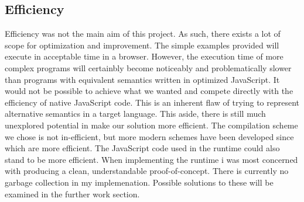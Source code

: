 \subsection{Efficiency}
Efficiency was not the main aim of this project. As such, there
exists a lot of scope for optimization and improvement. The simple
examples provided will execute in acceptable time in a browser. 
However, the execution time of more complex programs will certainbly 
become noticeably and problematically slower than programs with 
equivalent semantics written in optimized JavaScript. It would 
not be possible to achieve what we wanted and compete directly with
the efficiency of native JavaScript code. This is an inherent flaw
of trying to represent alternative semantics in a target language.
This aside, there is still much unexplored potential in make our
solution more efficient. The compilation scheme we chose is not
in-efficient, but more modern schemes have been developed since
which are more efficient. The JavaScript code used in the runtime
could also stand to be more efficient. When implementing the 
runtime i was most concerned with producing a clean, understandable
proof-of-concept. There is currently no garbage collection in my
implemenation. Possible solutions to these will be examined in
the further work section.

